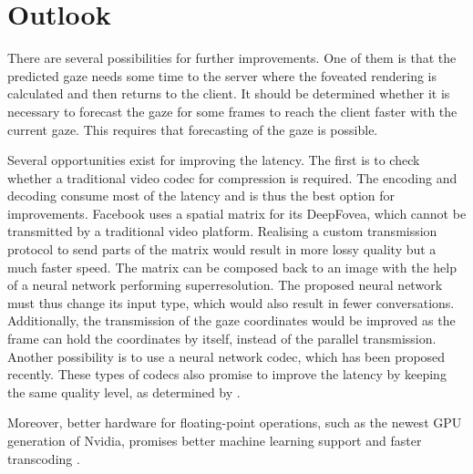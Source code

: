 \chapter{Outlook}\label{chapter:outlook}
There are several possibilities for further improvements. One of them is that the predicted gaze needs some time to the server where the foveated rendering is calculated and then returns to the client. It should be determined whether it is necessary to forecast the gaze for some frames to reach the client faster with the current gaze. This requires that forecasting of the gaze is possible.
\par
Several opportunities exist for improving the latency. The first is to check whether a traditional video codec for compression is required. The encoding and decoding consume most of the latency and is thus the best option for improvements. Facebook uses a spatial matrix for its DeepFovea, which cannot be transmitted by a traditional video platform. Realising a custom transmission protocol to send parts of the matrix would result in more lossy quality but a much faster speed. The matrix can be composed back to an image with the help of a neural network performing superresolution. The proposed neural network must thus change its input type, which would also result in fewer conversations. Additionally, the transmission of the gaze coordinates would be improved as the frame can hold the coordinates by itself, instead of the parallel transmission. Another possibility is to use a neural network codec, which has been proposed recently. These types of codecs also promise to improve the latency by keeping the same quality level, as determined by \cite{Ma2020}.
\par
Moreover, better hardware for floating-point operations, such as the newest GPU generation of Nvidia, promises better machine learning support and faster transcoding \parencite{RTX3000}.